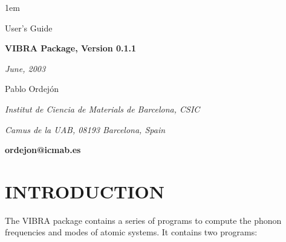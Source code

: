 %



\textheight 22cm
\textwidth 16cm
\oddsidemargin 1mm
\topmargin -15mm

\baselineskip=14pt
\parskip 5pt
\parindent 1em




\begin{titlepage}

\begin{center}

\vspace{1cm}

{\huge {\sc User's Guide}}

\vspace{3cm}

{\Huge {\bf VIBRA Package, Version 0.1.1}}

\vspace{3cm}

{\Large {\it June, 2003}}

\vspace{3cm}

{\Large Pablo Ordej\'on}

\vspace{5pt}

{\it Institut de Ciencia de Materials de Barcelona, CSIC}

{\it Camus de la UAB, 08193 Barcelona, Spain}

\vspace{5pt}

{\bf ordejon@icmab.es}


\end{center}

\end{titlepage}


%



\section{INTRODUCTION}

\noindent
The VIBRA package contains a series of programs to compute the
phonon frequencies and modes of atomic systems. It contains two 
programs:

